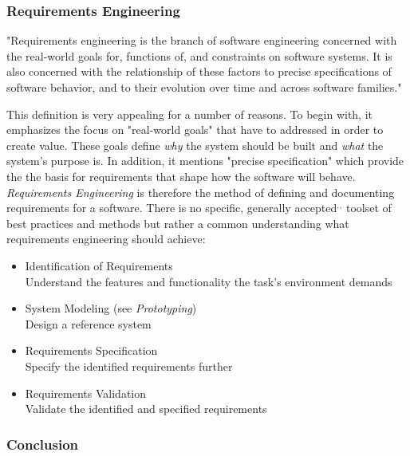     \subsubsection{Requirements Engineering}
    "Requirements engineering is the branch of software
    engineering concerned with the real-world goals for,
    functions of, and constraints on software systems. It
    is also concerned with the relationship of these
    factors to precise specifications of software behavior,
    and to their evolution over time and across software
    families."\autocite{Zave1997ClassificationEngineering}
    
    This definition is very appealing for a number of reasons. To begin with, it emphasizes the focus on "real-world goals" that have to addressed in order to create value. These goals define \textit{why} the system should be built and \textit{what} the system's purpose is. In addition, it mentions "precise specification" which provide the the basis for requirements that shape how the software will behave. \textit{Requirements Engineering} is therefore the method of defining and documenting requirements for a software. There is no specific, generally accepted\autocite{Budde1992Prototyping}$^{,}$\autocite{Sommerville1999RequirementsGuide}$^{,}$\autocite{Sommerville2010SoftwareEngineering} toolset of best practices and methods but rather a common understanding what requirements engineering should achieve: 
    \begin{itemize}
        \item Identification of Requirements\\
            Understand the features and functionality the task's environment demands
        \item System Modeling (see \textit{Prototyping})\\
            Design a reference system 
        \item Requirements Specification\\
            Specify the identified requirements further
        \item Requirements Validation\\
            Validate the identified and specified requirements
    \end{itemize}

    \subsubsection{Conclusion}
    
